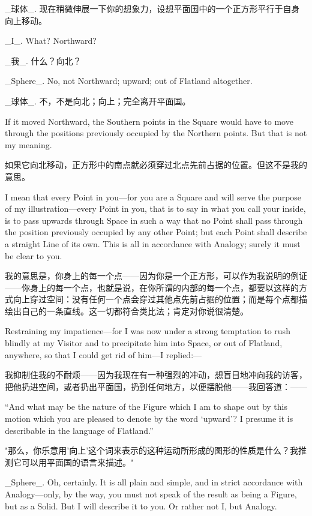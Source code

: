 \documentclass[12pt,UTF8]{ctexbook}
\begin{document}
\_球体\_. 现在稍微伸展一下你的想象力，设想平面国中的一个正方形平行于自身向上移动。

\_I\_. What? Northward?

\_我\_. 什么？向北？

\_Sphere\_. No, not Northward; upward; out of Flatland altogether.

\_球体\_. 不，不是向北；向上；完全离开平面国。

If it moved Northward, the Southern points in the Square would have to move through the positions previously occupied by the Northern points. But that is not my meaning.

如果它向北移动，正方形中的南点就必须穿过北点先前占据的位置。但这不是我的意思。

I mean that every Point in you---for you are a Square and will serve the purpose of my illustration---every Point in you, that is to say in what you call your inside, is to pass upwards through Space in such a way that no Point shall pass through the position previously occupied by any other Point; but each Point shall describe a straight Line of its own. This is all in accordance with Analogy; surely it must be clear to you.

我的意思是，你身上的每一个点——因为你是一个正方形，可以作为我说明的例证——你身上的每一个点，也就是说，在你所谓的内部的每一个点，都要以这样的方式向上穿过空间：没有任何一个点会穿过其他点先前占据的位置；而是每个点都描绘出自己的一条直线。这一切都符合类比法；肯定对你说很清楚。

Restraining my impatience---for I was now under a strong temptation to rush blindly at my Visitor and to precipitate him into Space, or out of Flatland, anywhere, so that I could get rid of him---I replied:---

我抑制住我的不耐烦——因为我现在有一种强烈的冲动，想盲目地冲向我的访客，把他扔进空间，或者扔出平面国，扔到任何地方，以便摆脱他——我回答道：——

``And what may be the nature of the Figure which I am to shape out by this motion which you are pleased to denote by the word `upward'? I presume it is describable in the language of Flatland.''

"那么，你乐意用'向上'这个词来表示的这种运动所形成的图形的性质是什么？我推测它可以用平面国的语言来描述。"

\_Sphere\_. Oh, certainly. It is all plain and simple, and in strict accordance with Analogy---only, by the way, you must not speak of the result as being a Figure, but as a Solid. But I will describe it to you. Or rather not I, but Analogy.
\end{document}

